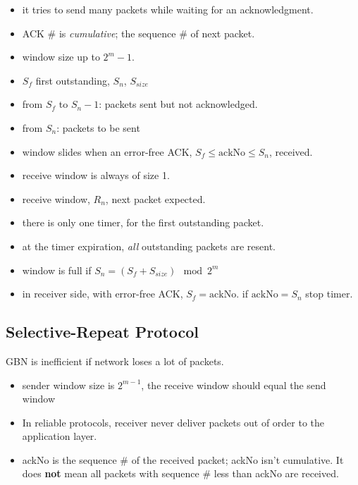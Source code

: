 \documentclass{article}
\begin{document}
\begin{itemize}
  \item it tries to send many packets while waiting for an acknowledgment.
  \item ACK \# is \textit{cumulative}; the sequence \# of next packet.
  \item window size up to $2^m -1$.
  \item $S_f$ first outstanding, $S_{n}$, $S_{size}$
  \item from $S_{f}$ to $S_{n}-1$: packets sent but not acknowledged.
  \item from $S_{n}$: packets to be sent
  \item window slides when an error-free ACK, $S_{f} \leq \text{ackNo} \leq S_{n}$, received.
  \item receive window is always of size 1.
  \item receive window, $R_{n}$, next packet expected.
  \item there is only one timer, for the first outstanding packet.
  \item at the timer expiration, \textit{all} outstanding packets are resent.
  \item window is full if $S_{n} = (S_{f} + S_{size}) \mod 2^{m}$
  \item in receiver side, with error-free ACK, $S_{f}=\text{ackNo}$. if $\text{ackNo}=S_{n}$ stop timer.
\end{itemize}

\subsection{Selective-Repeat Protocol}%
\label{subsec:SRP}
GBN is inefficient if network loses a lot of packets.
\begin{itemize}
  \item sender window size is $2^{m-1}$, the receive window should equal the send window
  \item In reliable protocols, receiver never deliver packets out of order to the application layer.
  \item ackNo is the sequence \# of the received packet; ackNo isn't cumulative.
        It does \textbf{not} mean all packets with sequence \# less than ackNo are received.
\end{itemize}
\end{document}
